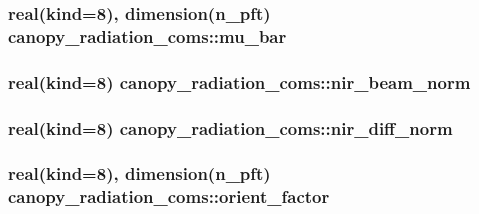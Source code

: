 \subsubsection[{mu\+\_\+bar}]{\setlength{\rightskip}{0pt plus 5cm}real(kind=8), dimension(n\+\_\+pft) canopy\+\_\+radiation\+\_\+coms\+::mu\+\_\+bar}\label{namespacecanopy__radiation__coms_ad267188bb42ff06c3f69554fbe4c595e}
\hypertarget{namespacecanopy__radiation__coms_a9387757f090749999584c88841b2d58d}{}
\subsubsection[{nir\+\_\+beam\+\_\+norm}]{\setlength{\rightskip}{0pt plus 5cm}real(kind=8) canopy\+\_\+radiation\+\_\+coms\+::nir\+\_\+beam\+\_\+norm}\label{namespacecanopy__radiation__coms_a9387757f090749999584c88841b2d58d}
\hypertarget{namespacecanopy__radiation__coms_a0f8a87e695122729f76ac2044ee7dec7}{}
\subsubsection[{nir\+\_\+diff\+\_\+norm}]{\setlength{\rightskip}{0pt plus 5cm}real(kind=8) canopy\+\_\+radiation\+\_\+coms\+::nir\+\_\+diff\+\_\+norm}\label{namespacecanopy__radiation__coms_a0f8a87e695122729f76ac2044ee7dec7}
\hypertarget{namespacecanopy__radiation__coms_a15026d6621180461dc537b2a9ea8e012}{}
\subsubsection[{orient\+\_\+factor}]{\setlength{\rightskip}{0pt plus 5cm}real(kind=8), dimension(n\+\_\+pft) canopy\+\_\+radiation\+\_\+coms\+::orient\+\_\+factor}\label{namespacecanopy__radiation__coms_a15026d6621180461dc537b2a9ea8e012}
\hypertarget{namespacecanopy__radiation__coms_a9a05bcd1d22939f34bc3b6d2f4464f02}{}
